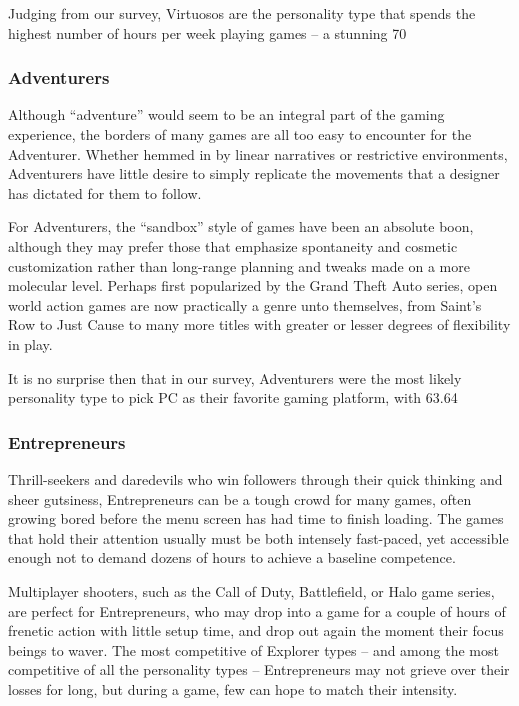 \documentclass{article}
\begin{document}
Judging from our survey, Virtuosos are the personality type that spends the highest number of hours per week playing games – a stunning 70%
\subsubsection{Adventurers}
Although “adventure” would seem to be an integral part of the gaming experience, the borders of many games are all too easy to encounter for the Adventurer. Whether hemmed in by linear narratives or restrictive environments, Adventurers have little desire to simply replicate the movements that a designer has dictated for them to follow.

For Adventurers, the “sandbox” style of games have been an absolute boon, although they may prefer those that emphasize spontaneity and cosmetic customization rather than long-range planning and tweaks made on a more molecular level. Perhaps first popularized by the Grand Theft Auto series, open world action games are now practically a genre unto themselves, from Saint’s Row to Just Cause to many more titles with greater or lesser degrees of flexibility in play.

It is no surprise then that in our survey, Adventurers were the most likely personality type to pick PC as their favorite gaming platform, with 63.64%
\subsubsection{Entrepreneurs}
Thrill-seekers and daredevils who win followers through their quick thinking and sheer gutsiness, Entrepreneurs can be a tough crowd for many games, often growing bored before the menu screen has had time to finish loading. The games that hold their attention usually must be both intensely fast-paced, yet accessible enough not to demand dozens of hours to achieve a baseline competence.

Multiplayer shooters, such as the Call of Duty, Battlefield, or Halo game series, are perfect for Entrepreneurs, who may drop into a game for a couple of hours of frenetic action with little setup time, and drop out again the moment their focus beings to waver. The most competitive of Explorer types – and among the most competitive of all the personality types – Entrepreneurs may not grieve over their losses for long, but during a game, few can hope to match their intensity.
\end{document}
